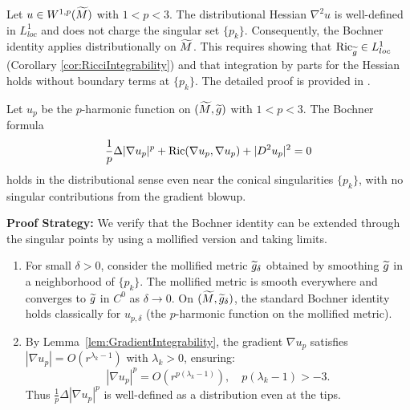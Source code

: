 \begin{lemma}\label{lem:DistHessian}
Let $u \in W^{1,p}(\widetilde{M})$ with $1 < p < 3$. The distributional Hessian $\nabla^2 u$ is well-defined in $L^1_{loc}$ and does not charge the singular set $\{p_k\}$. Consequently, the Bochner identity applies distributionally on $\widetilde{M}$.
This requires showing that $\mathrm{Ric}_{\widetilde{g}} \in L^1_{loc}$ (Corollary \ref{cor:RicciIntegrability}) and that integration by parts for the Hessian holds without boundary terms at $\{p_k\}$. The detailed proof is provided in .
\end{lemma}

\begin{theorem}\label{thm:BochnerBubbleTips}
Let $u_p$ be the $p$-harmonic function on $(\widetilde{M}, \widetilde{g})$ with $1 < p < 3$. The Bochner formula
\begin{equation}\label{eq:BochnerFormula}
    \frac{1}{p} \Delta |\nabla u_p|^p + \mathrm{Ric}(\nabla u_p, \nabla u_p) + |D^2 u_p|^2 = 0
\end{equation}
holds in the distributional sense even near the conical singularities $\{p_k\}$, with no singular contributions from the gradient blowup.

\textbf{Proof Strategy:} We verify that the Bochner identity can be extended through the singular points by using a mollified version and taking limits.

\begin{enumerate}
    \item[\textbf{Step 1: Mollification.}] For small $\delta > 0$, consider the mollified metric $\widetilde{g}_\delta$ obtained by smoothing $\widetilde{g}$ in a neighborhood of $\{p_k\}$. The mollified metric is smooth everywhere and converges to $\widetilde{g}$ in $C^0$ as $\delta \to 0$. On $(\widetilde{M}, \widetilde{g}_\delta)$, the standard Bochner identity holds classically for $u_{p,\delta}$ (the $p$-harmonic function on the mollified metric).
    
    \item[\textbf{Step 2: Gradient Control.}] By Lemma~\ref{lem:GradientIntegrability}, the gradient $\nabla u_p$ satisfies $|\nabla u_p| = O(r^{\lambda_k - 1})$ with $\lambda_k > 0$, ensuring:
    \begin{equation}
        |\nabla u_p|^p = O(r^{p(\lambda_k - 1)}), \quad p(\lambda_k - 1) > -3.
    \end{equation}
    Thus $\frac{1}{p} \Delta |\nabla u_p|^p$ is well-defined as a distribution even at the tips.
    

\end{enumerate}
\end{theorem}
